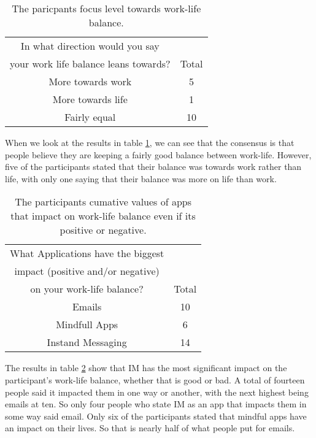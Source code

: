 \documentclass{sigchi}
\begin{document}
	\begin{table}[ht]
		\centering
		\small
		\begin{tabular}[t]{ |c| c | }
			\hline
			In what direction would you say & \\
			your work life balance leans towards? & Total  \\ 
			\hline
			More towards work & 5 \\ 
			\hline
			More towards life & 1  \\ 
			\hline
			Fairly equal &  10 \\
			\hline
		\end{tabular}
		\caption{The paricpants focus level towards work-life balance.}
		\label{tab:work_life_swing}
	\end{table}%

	
	When we look at the results in table \ref{tab:work_life_swing}, we can see that the consensus is that people believe they are keeping a fairly good balance between work-life. However, five of the participants stated that their balance was towards work rather than life, with only one saying that their balance was more on life than work. 


	\begin{table}[ht]
		\centering
		\small
		\begin{tabular}[t]{ |c| c | }
			\hline
			What Applications have the biggest & \\
			impact (positive and/or negative) & \\
			on your work-life balance?  & Total  \\ 
			\hline
			Emails & 10 \\ 
			\hline
			Mindfull Apps & 6  \\ 
			\hline
			Instand Messaging &  14 \\
			\hline
			
		\end{tabular}
		\caption{The participants cumative values of apps that impact on work-life balance even if its positive or negative.}
		\label{tab:app_impact}
	\end{table}%

	The results in table \ref{tab:app_impact} show that IM has the most significant impact on the participant's work-life balance, whether that is good or bad. A total of fourteen people said it impacted them in one way or another, with the next highest being emails at ten. So only four people who state IM as an app that impacts them in some way said email. Only six of the participants stated that mindful apps have an impact on their lives. So that is nearly half of what people put for emails.
	
\end{document}
